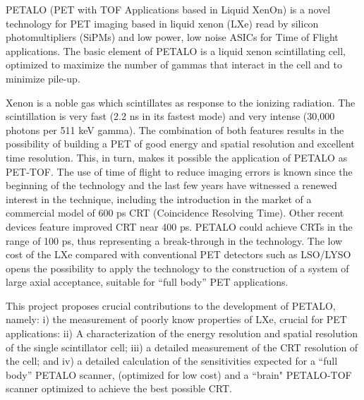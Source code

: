 PETALO (PET with TOF Applications based in Liquid XenOn) is a novel technology for PET imaging based in liquid xenon (LXe) read by silicon photomultipliers (SiPMs) and  low power, low noise ASICs for Time of Flight applications. The basic element of PETALO is a liquid xenon scintillating cell, optimized to maximize the number of gammas that interact in the cell and to minimize pile-up. 

Xenon is a noble gas which scintillates as response to the ionizing radiation. The scintillation is very fast (2.2 ns in its fastest mode) and very intense (30,000 photons per 511 keV gamma). The combination of both features results in the possibility of building a PET of good energy and spatial resolution and excellent time resolution. This, in turn, makes it possible the application of PETALO as PET-TOF. The use of time of flight to reduce imaging errors is known since the beginning of the technology and the last few years have witnessed a renewed interest in the technique, including the introduction in the market of a commercial model of 600 ps CRT (Coincidence Resolving Time). Other recent devices feature improved CRT near 400 ps. PETALO could achieve CRTs in the range of 100 ps, thus representing a break-through in the technology.  The low cost of the LXe compared with conventional PET detectors such as LSO/LYSO opens the possibility to apply the technology to the construction of a system of large axial acceptance, suitable for ``full body'' PET applications. 

This project proposes crucial contributions to the development of PETALO, namely: i) the measurement of poorly know properties of LXe, crucial  for PET applications: ii) 
A characterization of the energy resolution and spatial resolution of the single scintillator cell; iii) a detailed measurement of the CRT resolution of the cell; and  iv) a  detailed calculation of the sensitivities expected for a ``full body'' PETALO scanner, (optimized for low cost) and a ``brain" PETALO-TOF scanner optimized to achieve the best possible CRT. 

